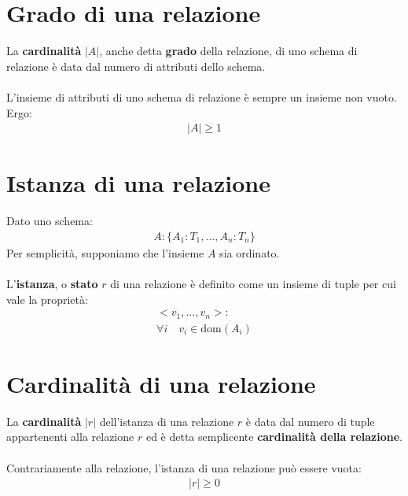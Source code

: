 \section{Grado di una relazione}
La \textbf{cardinalità} $|A|$, anche detta \textbf{grado} della relazione, di uno schema di relazione è data dal numero di attributi dello schema.\\\\
L'insieme di attributi di uno schema di relazione è sempre un insieme non vuoto. Ergo:
    \begin{equation}\begin{aligned}
        |A| \geq 1
    \end{aligned}\end{equation}

\section{Istanza di una relazione}
Dato uno schema:
    \begin{equation}\begin{aligned}
        A: \{   A_1:T_1, ..., A_n:T_n\}
    \end{aligned}\end{equation}
Per semplicità, supponiamo che l'insieme $A$ sia ordinato.\\\\
L'\textbf{istanza}, o \textbf{stato} $r$ di una relazione è definito come un insieme di tuple per cui vale la proprietà:
    \begin{equation}\begin{aligned}
        <v_1, ..., v_n>:\\
        \forall i \quad v_i \in \text{dom}(A_i)
    \end{aligned}\end{equation}

\section{Cardinalità di una relazione}
La \textbf{cardinalità} $|r|$ dell'istanza di una relazione $r$ è data dal numero di tuple appartenenti alla relazione $r$ ed è detta semplicente \textbf{cardinalità della relazione}.\\\\
Contrariamente alla relazione, l'istanza di una relazione può essere vuota:
    \begin{equation}\begin{aligned}
        |r| \geq 0
    \end{aligned}\end{equation}


